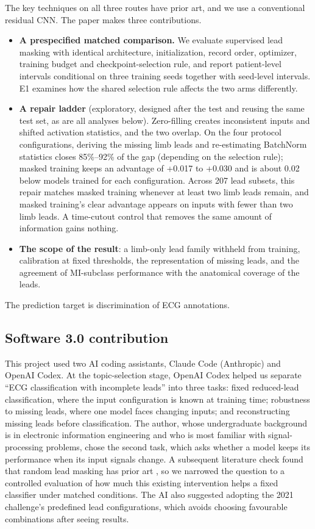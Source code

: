 The key techniques on all three routes have prior art, and we use a conventional residual CNN. The paper makes three contributions.
\begin{itemize}
\item \textbf{A prespecified matched comparison.} We evaluate supervised lead masking with identical architecture, initialization, record order, optimizer, training budget and checkpoint-selection rule, and report patient-level intervals conditional on three training seeds together with seed-level intervals. E1 examines how the shared selection rule affects the two arms differently.
\item \textbf{A repair ladder} (exploratory, designed after the test and reusing the same test set, as are all analyses below). Zero-filling creates inconsistent inputs and shifted activation statistics, and the two overlap. On the four protocol configurations, deriving the missing limb leads and re-estimating BatchNorm statistics closes 85\%--92\% of the gap (depending on the selection rule); masked training keeps an advantage of +0.017 to +0.030 and is about 0.02 below models trained for each configuration. Across 207 lead subsets, this repair matches masked training whenever at least two limb leads remain, and masked training's clear advantage appears on inputs with fewer than two limb leads. A time-cutout control that removes the same amount of information gains nothing.
\item \textbf{The scope of the result}: a limb-only lead family withheld from training, calibration at fixed thresholds, the representation of missing leads, and the agreement of MI-subclass performance with the anatomical coverage of the leads.
\end{itemize}
The prediction target is discrimination of ECG annotations.

\subsection{Software 3.0 contribution}
\label{sec:ai-formulation}

This project used two AI coding assistants, Claude Code (Anthropic) and OpenAI Codex. At the topic-selection stage, OpenAI Codex helped us separate ``ECG classification with incomplete leads'' into three tasks: fixed reduced-lead classification, where the input configuration is known at training time; robustness to missing leads, where one model faces changing inputs; and reconstructing missing leads before classification. The author, whose undergraduate background is in electronic information engineering and who is most familiar with signal-processing problems, chose the second task, which asks whether a model keeps its performance when its input signals change. A subsequent literature check found that random lead masking has prior art \citep{oh2022leadagnostic}, so we narrowed the question to a controlled evaluation of how much this existing intervention helps a fixed classifier under matched conditions. The AI also suggested adopting the 2021 challenge's predefined lead configurations, which avoids choosing favourable combinations after seeing results.


